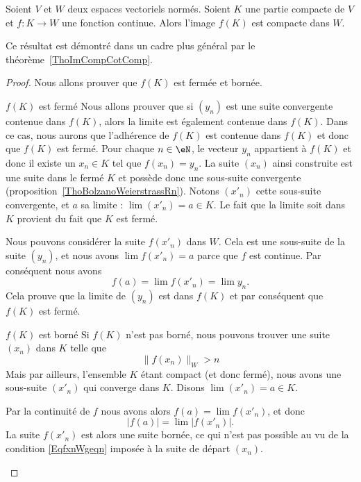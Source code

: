 \begin{proposition}		\label{PropContinueCompactBorne}
	Soient $V$ et $W$ deux espaces vectoriels normés. Soient $K$ une partie compacte de $V$ et $f\colon K\to W$ une fonction continue. Alors l'image $f(K)$ est compacte dans $W$.
\end{proposition}
Ce résultat est démontré dans un cadre plus général par le théorème~\ref{ThoImCompCotComp}.

\begin{proof}
	Nous allons prouver que $f(K)$ est fermée et bornée.
    \begin{subproof}
		\item[$f(K)$ est fermé] Nous allons prouver que si $(y_n)$ est une suite convergente contenue dans $f(K)$, alors la limite est également contenue dans $f(K)$. Dans ce cas, nous aurons que l'adhérence de $f(K)$ est contenue dans $f(K)$ et donc que $f(K)$ est fermé. Pour chaque $n\in\eN$, le vecteur $y_n$ appartient à $f(K)$ et donc il existe un $x_n\in K$ tel que $f(x_n)=y_n$. La suite $(x_n)$ ainsi construite est une suite dans le fermé $K$ et possède donc une sous-suite convergente (proposition~\ref{ThoBolzanoWeierstrassRn}). Notons $(x'_n)$ cette sous-suite convergente, et $a$ sa limite : $\lim(x'_n)=a\in K$. Le fait que la limite soit dans $K$ provient du fait que $K$ est fermé.

			Nous pouvons considérer la suite $f(x'_n)$ dans $W$. Cela est une sous-suite de la suite $(y_n)$, et nous avons $\lim f(x'_n)=a$ parce que $f$ est continue. Par conséquent nous avons
			\begin{equation}
				f(a)=\lim f(x'_n)=\lim y_n.
			\end{equation}
			Cela prouve que la limite de $(y_n)$ est dans $f(K)$ et par conséquent que $f(K)$ est fermé.

		\item[$f(K)$ est borné]
			Si $f(K)$ n'est pas borné, nous pouvons trouver une suite $(x_n)$ dans $K$ telle que
			\begin{equation}		\label{EqfxnWgeqn}
				\| f(x_n) \|_W>n
			\end{equation}
			Mais par ailleurs, l'ensemble $K$ étant compact (et donc fermé), nous avons une sous-suite $(x'_n)$ qui converge dans $K$. Disons $\lim(x'_n)=a\in K$.

			Par la continuité de $f$ nous avons alors $f(a)=\lim f(x'_n)$, et donc
			\begin{equation}
				| f(a) |=\lim | f(x'_n) |.
			\end{equation}
			La suite $f(x'_n)$ est alors une suite bornée, ce qui n'est pas possible au vu de la condition \eqref{EqfxnWgeqn} imposée à la suite de départ $(x_n)$.
    \end{subproof}
\end{proof}

